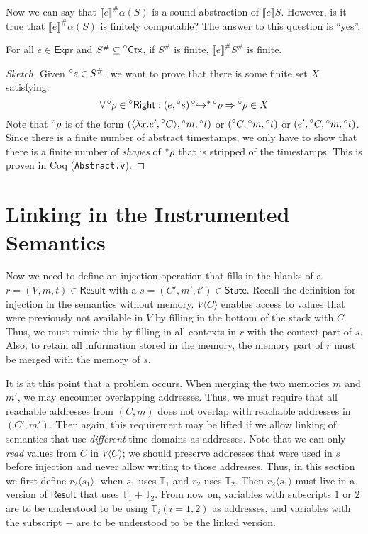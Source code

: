 \documentclass[acmsmall,screen,review]{acmart}\settopmatter{printfolios=true,printccs=false,printacmref=false}
\newcommand*{\A}[1]{\prescript{\circ}{}{#1}}
\newcommand*{\Abs}[1]{{#1}^{\#}}
\newcommand*{\Expr}{\mathsf{Expr}}
\newcommand*{\Time}{\mathbb{T}}
\newcommand*{\Ctx}{\mathsf{Ctx}}
\newcommand*{\Right}{\mathsf{Right}}
\newcommand*{\mem}{m}
\newcommand*{\State}{\mathsf{State}}
\newcommand*{\Result}{\mathsf{Result}}
\newcommand*{\semarrow}{\hookrightarrow}
\newcommand*{\sembracket}[1]{\lBrack{#1}\rBrack}
\newcommand*{\inject}[2]{{#2}\langle{#1}\rangle}
\begin{document}
Now we can say that $\Abs{\sembracket{e}}\alpha(S)$ is a sound abstraction of $\sembracket{e}S$.
However, is it true that $\Abs{\sembracket{e}}\alpha(S)$ is finitely computable?
The answer to this question is ``yes''.

\begin{theorem}[Finiteness]
  For all $e\in\Expr$ and $\Abs{S}\subseteq\A\Ctx$, if $\Abs{S}$ is finite, $\Abs{\sembracket{e}}\Abs{S}$ is finite.
\end{theorem}
\begin{proof}[Sketch]
  Given $\A{s}\in\Abs{S}$, we want to prove that there is some finite set $X$ satisfying:
  \[\forall \A\rho\in\A\Right:(e,\A{s})\A\semarrow^*\A\rho\Rightarrow\A\rho\in X\]
  Note that $\A\rho$ is of the form $(\langle\lambda x.e',\A{C}\rangle,\A\mem,\A{t})$ or $(\A{C},\A\mem,\A{t})$ or $(e',\A{C},\A\mem,\A{t})$.
  Since there is a finite number of abstract timestamps, we only have to show that there is a finite number of \emph{shapes} of $\A\rho$ that is stripped of the timestamps.
  This is proven in Coq (\texttt{Abstract.v}).
\end{proof}

\section{Linking in the Instrumented Semantics}
Now we need to define an injection operation that fills in the blanks of a $r=(V,\mem,t)\in\Result$ with a $s=(C',\mem',t')\in\State$.
Recall the definition for injection in the semantics without memory.
$\inject{C}{V}$ enables access to values that were previously not available in $V$ by filling in the bottom of the stack with $C$.
Thus, we must mimic this by filling in all contexts in $r$ with the context part of $s$.
Also, to retain all information stored in the memory, the memory part of $r$ must be merged with the memory of $s$.

It is at this point that a problem occurs.
When merging the two memories $\mem$ and $\mem'$, we may encounter overlapping addresses.
Thus, we must require that all reachable addresses from $(C,\mem)$ does not overlap with reachable addresses in $(C',\mem')$.
Then again, this requirement may be lifted if we allow linking of semantics that use \emph{different} time domains as addresses.
Note that we can only \emph{read} values from $C$ in $\inject{C}{V}$; we should preserve addresses that were used in $s$ before injection and never allow writing to those addresses.
Thus, in this section we first define $\inject{s_1}{r_2}$, when $s_1$ uses $\Time_1$ and $r_2$ uses $\Time_2$.
Then $\inject{s_1}{r_2}$ must live in a version of $\Result$ that uses $\Time_1+\Time_2$.
From now on, variables with subscripts $1$ or $2$ are to be understood to be using $\Time_i(i=1,2)$ as addresses, and variables with the subscript $+$ are to be understood to be the linked version.
\end{document}

